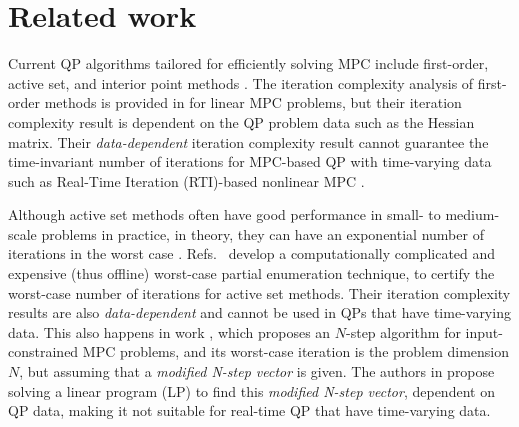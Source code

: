 \section{Related work}
Current QP algorithms tailored for efficiently solving MPC include first-order, active set, and interior point methods \cite{stellato2020osqp, wu2023simple, wu2023construction,ferreau2014qpoases,wang2009fast}. The iteration complexity analysis of first-order methods is provided in \cite{richter2011computational, giselsson2012execution, patrinos2013accelerated} for linear MPC problems, but their iteration complexity result is dependent on the QP problem data such as the Hessian matrix. Their \textit{data-dependent} iteration complexity result cannot guarantee the time-invariant number of iterations for MPC-based QP with time-varying data such as  Real-Time Iteration (RTI)-based nonlinear MPC \cite{gros2020linear}.

Although active set methods often have good performance in small- to medium-scale problems in practice, in theory, they can have an exponential number of iterations in the worst case \cite{klee1972good}. Refs.\  \cite{cimini2017exact, arnstrom2019exact, cimini2019complexity,arnstrom2020complexity, arnstrom2021unifying} develop a computationally complicated and expensive (thus offline) worst-case partial enumeration technique, to certify the worst-case number of iterations for active set methods. Their iteration complexity results are also \textit{data-dependent} and cannot be used in QPs that have time-varying data. This also happens in work \cite{okawa2021linear}, which proposes an $N$-step algorithm for input-constrained MPC problems, and its worst-case iteration is the problem dimension $N$, but assuming that a \textit{modified N-step vector} is given. The authors in \cite{okawa2021linear} propose solving a linear program (LP) to find this \textit{modified N-step vector}, dependent on QP data, making it not suitable for real-time QP that have time-varying data.


